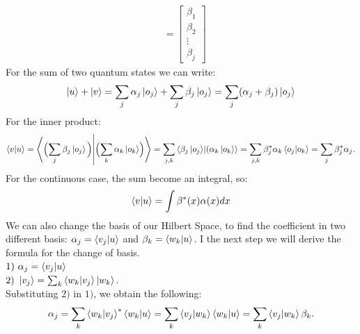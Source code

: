 \documentclass{article}
\begin{document}
  \begin{align*}
    [\mathrm{B_j}] &= \begin{bmatrix}
           \beta_1 \\
           \beta_2  \\
           \vdots \\
           \beta_j
         \end{bmatrix}
  \end{align*} 
For the sum of two quantum states we can write:
$$\ket{u} + \ket{v} = \sum_{j} \alpha_j \ket{o_j} + \sum_{j} \beta_j \ket{o_j} = \sum_{j}(\alpha_j + \beta_j) \ket{o_j}  $$
For the inner product:
  $$\bra{v}\ket{u} = \bra{ \Bigl( \sum_j \beta_j \ket{o_j} \Bigl) }\ket{ \Bigl( \sum_k{\alpha_k \ket{o_k}} \Bigl) } = \sum_{j,k} \bra{\beta_j \ket{o_j}} \ket{(\alpha_k \ket{o_k}} = \sum_{j,k} \beta^*_j \alpha_k \bra{o_j} \ket{o_k} = \sum_j \beta_j^* \alpha_j.$$
  For the continuous case, the sum become an integral, so:
  $$ \bra{v}\ket{u} = \int \beta^*(x) \alpha(x) dx$$
We can also change the basis of our Hilbert Space, to find the coefficient in two different basis:
$ \alpha_j = \bra{v_j} \ket{u}$ and $\beta_k = \bra{w_k}\ket{u}$.
I the next step we will derive the formula for the change of basis. \\ 
$1) \ \alpha_j = \bra{v_j}\ket{u}$ \\
$2)\  \ket{v_j} = \sum_k \bra{w_k} \ket{v_j} \ket{w_k}$. \\
Substituting $2)$ in $ 1)$, we obtain the following: $$\alpha_j = \sum_k \bra{w_k} \ket{v_j}^* \bra{w_k} \ket{u} = \sum_k \bra{v_j} \ket{w_k} \bra{w_k} \ket{u} = \sum_k \bra{v_j} \ket{w_k} \beta_k.$$
\end{document}
